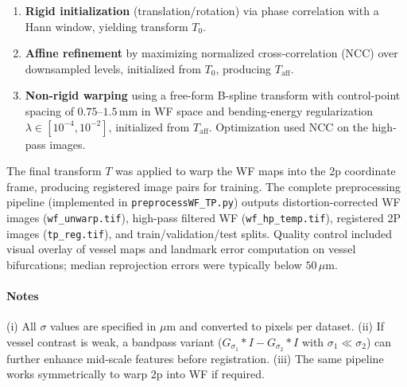\begin{enumerate}
  \item \textbf{Rigid initialization} (translation/rotation) via phase correlation with a Hann window, yielding transform $T_{0}$.
  \item \textbf{Affine refinement} by maximizing normalized cross-correlation (NCC) over downsampled levels, initialized from $T_{0}$, producing $T_{\mathrm{aff}}$.
  \item \textbf{Non-rigid warping} using a free-form B-spline transform with control-point spacing of $0.75\text{--}1.5\,\mathrm{mm}$ in WF space and bending-energy regularization $\lambda \in [10^{-4}, 10^{-2}]$, initialized from $T_{\mathrm{aff}}$. Optimization used NCC on the high-pass images.
\end{enumerate}

The final transform $T$ was applied to warp the WF maps into the 2p coordinate frame, producing registered image pairs for training. The complete preprocessing pipeline (implemented in \texttt{preprocessWF\_TP.py}) outputs distortion-corrected WF images (\texttt{wf\_unwarp.tif}), high-pass filtered WF (\texttt{wf\_hp\_temp.tif}), registered 2P images (\texttt{tp\_reg.tif}), and train/validation/test splits. Quality control included visual overlay of vessel maps and landmark error computation on vessel bifurcations; median reprojection errors were typically below $50\,\mu\mathrm{m}$.

\paragraph{Notes} (i) All $\sigma$ values are specified in $\mu$m and converted to pixels per dataset. (ii) If vessel contrast is weak, a bandpass variant ($G_{\sigma_1} * I - G_{\sigma_2} * I$ with $\sigma_1 \ll \sigma_2$) can further enhance mid-scale features before registration. (iii) The same pipeline works symmetrically to warp 2p into WF if required.
